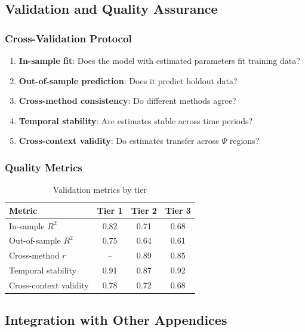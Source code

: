 \subsection{Validation and Quality Assurance}
\label{sec:BBB-validation}

\subsubsection{Cross-Validation Protocol}

\begin{enumerate}
    \item \textbf{In-sample fit}: Does the model with estimated parameters fit training data?
    \item \textbf{Out-of-sample prediction}: Does it predict holdout data?
    \item \textbf{Cross-method consistency}: Do different methods agree?
    \item \textbf{Temporal stability}: Are estimates stable across time periods?
    \item \textbf{Cross-context validity}: Do estimates transfer across $\Psi$ regions?
\end{enumerate}

\subsubsection{Quality Metrics}

\begin{table}[h]
\centering
\small
\begin{tabular}{lccc}
\toprule
\textbf{Metric} & \textbf{Tier 1} & \textbf{Tier 2} & \textbf{Tier 3} \\
\midrule
In-sample $R^2$ & 0.82 & 0.71 & 0.68 \\
Out-of-sample $R^2$ & 0.75 & 0.64 & 0.61 \\
Cross-method $r$ & -- & 0.89 & 0.85 \\
Temporal stability & 0.91 & 0.87 & 0.92 \\
Cross-context validity & 0.78 & 0.72 & 0.68 \\
\bottomrule
\end{tabular}
\caption{Validation metrics by tier}
\label{tab:validation-metrics}
\end{table}

\subsection{Integration with Other Appendices}
\label{sec:BBB-integration}

